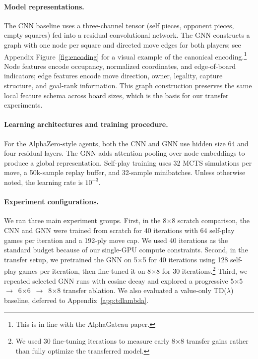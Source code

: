 \documentclass{article}
\begin{document}
\paragraph{Model representations.}
The CNN baseline uses a three-channel tensor (self pieces, opponent pieces, empty squares) fed
into a residual convolutional network.
The GNN constructs a graph with one node per square and directed move edges for both players; see
Appendix Figure~\ref{fig:encoding} for a visual example of the canonical encoding.\footnote{This is in line with the AlphaGateau paper.}
Node features encode occupancy, normalized coordinates, and edge-of-board indicators; edge features
encode move direction, owner, legality, capture structure, and goal-rank information.
This graph construction preserves the same local feature schema across board sizes, which is the
basis for our transfer experiments.

\paragraph{Learning architectures and training procedure.}
For the AlphaZero-style agents, both the CNN and GNN use hidden size 64 and four residual layers.
The GNN adds attention pooling over node embeddings to produce a global representation.
Self-play training uses 32 MCTS simulations per move, a 50k-sample replay buffer, and
32-sample minibatches.
Unless otherwise noted, the learning rate is $10^{-3}$.

\paragraph{Experiment configurations.}
We ran three main experiment groups.
First, in the 8$\times$8 scratch comparison, the CNN and GNN were trained from scratch for
40 iterations with 64 self-play games per iteration and a 192-ply move cap.
We used 40 iterations as the standard budget because of our single-GPU compute constraints.
Second, in the transfer setup, we pretrained the GNN on 5$\times$5 for 40 iterations using
128 self-play games per iteration, then fine-tuned it on 8$\times$8 for 30 iterations.\footnote{We used 30 fine-tuning iterations to measure early 8$\times$8 transfer gains rather than fully optimize the transferred model.}
Third, we repeated selected GNN runs with cosine decay and explored a progressive
5$\times$5~$\rightarrow$~6$\times$6~$\rightarrow$~8$\times$8 transfer ablation. We also
evaluated a value-only TD($\lambda$) baseline, deferred to Appendix~\ref{app:tdlambda}.
\end{document}
